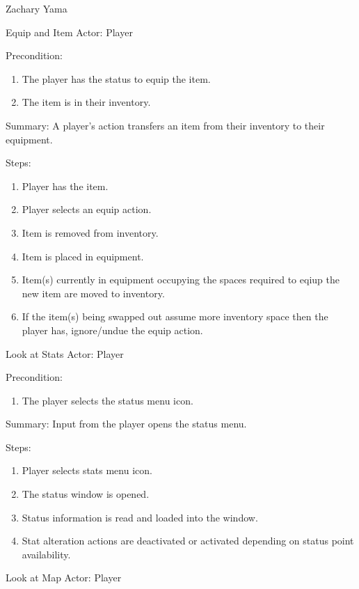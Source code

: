\documentclass[12pt]{report}
\begin{document}
\begin{section}{Zachary Yama}
\begin{subsection}{Equip and Item}
Actor: Player

Precondition: 
\begin{enumerate}
\item The player has the status to equip the item. 
\item The item is in their inventory.
\end{enumerate}

Summary: A player's action transfers an item from their inventory to their
equipment.

Steps:
\begin{enumerate}
\item Player has the item.
\item Player selects an equip action.
\item Item is removed from inventory.
\item Item is placed in equipment.
\item Item(s) currently in equipment occupying the spaces required to eqiup
the new item are moved to inventory.
\item If the item(s) being swapped out assume more inventory space then the
player has, ignore/undue the equip action.
\end{enumerate}
\end{subsection}

\begin{subsection}{Look at Stats}
Actor: Player

Precondition:
\begin{enumerate}
\item The player selects the status menu icon.
\end{enumerate}

Summary: Input from the player opens the status menu.

Steps:
\begin{enumerate}
\item Player selects stats menu icon.
\item The status window is opened.
\item Status information is read and loaded into the window.
\item Stat alteration actions are deactivated or activated depending on
status point availability.
\end{enumerate}
\end{subsection}

\begin{subsection}{Look at Map}
Actor: Player


\end{subsection}
\end{section}
\end{document}
